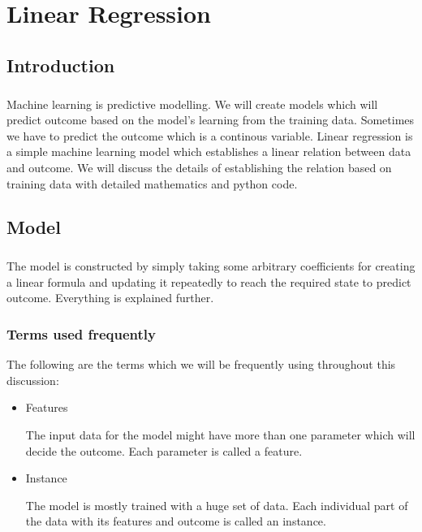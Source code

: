 
\chapter{Linear Regression}
\label{chp:linear}


\section{Introduction}

\paragraph{}
Machine learning is predictive modelling. We will create models which will predict outcome based on the model's learning from the training data.
Sometimes we have to predict the outcome which is a continous variable. Linear regression is a simple machine learning model which establishes a linear relation between data and outcome.
We will discuss the details of establishing the relation based on training data with detailed mathematics and python code.

\section{Model}

\paragraph{}
The model is constructed by simply taking some arbitrary coefficients for creating a linear formula
and updating it repeatedly to reach the required state to predict outcome. Everything is explained further.

\subsection{Terms used frequently}
The following are the terms which we will be frequently using throughout this discussion:

\vfill

\begin{itemize}
    \item Features
    
    The input data for the model might have more than one parameter which will decide the outcome.
    Each parameter is called a feature.

    \item Instance
    
    The model is mostly trained with a huge set of data. Each individual part of the data with its 
    features and outcome is called an instance.

\end{itemize}

